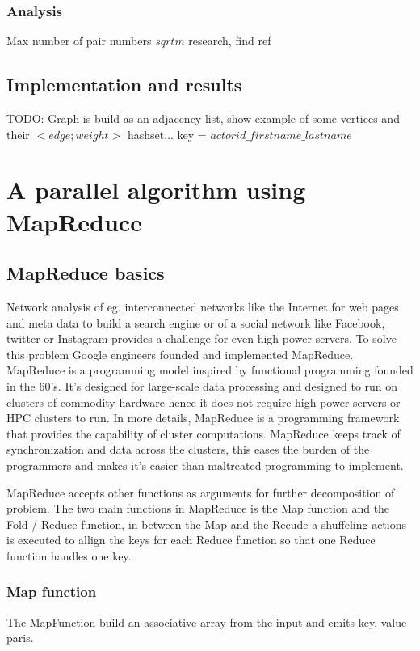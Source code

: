\documentclass{article}
\begin{document}
\subsubsection{Analysis}
Max number of pair numbers $sqrt{m}$ research, find ref



\subsection{Implementation and results}
TODO: Graph is build as an adjacency list, show example of some vertices and their $<edge;weight>$ hashset...
key = $actorid\_firstname\_lastname$

\section{A parallel algorithm using MapReduce}

\subsection{MapReduce basics}
Network analysis of eg. interconnected networks like the Internet for web pages and meta data to build a search engine or of a social network like Facebook, twitter or Instagram provides a challenge for even high power servers. To solve this problem Google engineers founded and implemented MapReduce. MapReduce is a programming model inspired by functional programming founded in the 60's. It's designed for large-scale data processing and designed to run on clusters of commodity hardware hence it does not require high power servers or HPC clusters to run.
In more details, MapReduce is a programming framework that provides the capability of cluster computations. MapReduce keeps track of synchronization and data across the clusters, this eases the burden of the programmers and makes it's easier than maltreated programming to implement.

\noindent MapReduce accepts other functions as arguments for further decomposition of problem. The two main functions in MapReduce is the Map function and the Fold / Reduce function, in between the Map and the Recude a shuffeling actions is executed to allign the keys for each Reduce function so that one Reduce function handles one key.

\subsubsection{Map function}
The MapFunction build an associative array from the input and emits key, value paris.
\end{document}
